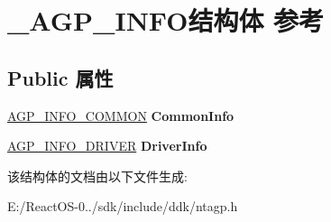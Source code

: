 \hypertarget{struct___a_g_p___i_n_f_o}{}\section{\+\_\+\+A\+G\+P\+\_\+\+I\+N\+F\+O结构体 参考}
\label{struct___a_g_p___i_n_f_o}
\subsection*{Public 属性}
\begin{DoxyCompactItemize}
\item 
\mbox{\label{struct___a_g_p___i_n_f_o_a935dcac55bf274346e75c63f27c5a700}} 
\hyperlink{struct___a_g_p___i_n_f_o___c_o_m_m_o_n}{A\+G\+P\+\_\+\+I\+N\+F\+O\+\_\+\+C\+O\+M\+M\+ON} {\bfseries Common\+Info}
\item 
\mbox{\label{struct___a_g_p___i_n_f_o_a8a513ed6f79c4aaab99339487b9fefe2}} 
\hyperlink{struct___a_g_p___i_n_f_o___d_r_i_v_e_r}{A\+G\+P\+\_\+\+I\+N\+F\+O\+\_\+\+D\+R\+I\+V\+ER} {\bfseries Driver\+Info}
\end{DoxyCompactItemize}


该结构体的文档由以下文件生成\+:\begin{DoxyCompactItemize}
\item 
E\+:/\+React\+O\+S-\/0../sdk/include/ddk/ntagp.\+h\end{DoxyCompactItemize}
